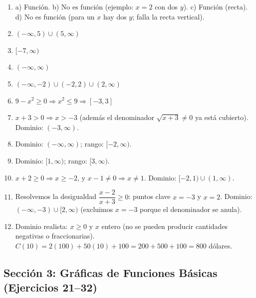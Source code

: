 \documentclass[12pt, letterpaper]{article}
\begin{document}
  \begin{enumerate}[resume=respuestas, leftmargin=*, label=\textbf{\arabic*.}]
    \item a) Función. b) No es función (ejemplo: $x=2$ con dos $y$). c) Función (recta). d) No es función (para un $x$ hay dos $y$; falla la recta vertical).

    \item $(-\infty, 5) \cup (5, \infty)$

    \item $[-7, \infty)$

    \item $(-\infty, \infty)$

    \item $(-\infty, -2) \cup (-2, 2) \cup (2, \infty)$

    \item $9 - x^2 \geq 0 \Rightarrow x^2 \leq 9 \Rightarrow [-3, 3]$

    \item $x + 3 > 0 \Rightarrow x > -3$ (además el denominador $\sqrt{x+3} \neq 0$ ya está cubierto). Dominio: $(-3, \infty)$.

    \item Dominio: $(-\infty, \infty)$; rango: $[-2, \infty)$.

    \item Dominio: $[1, \infty)$; rango: $[3, \infty)$.

    \item $x + 2 \geq 0 \Rightarrow x \geq -2$, y $x - 1 \neq 0 \Rightarrow x \neq 1$. Dominio: $[-2, 1) \cup (1, \infty)$.

    \item Resolvemos la desigualdad $\dfrac{x-2}{x+3} \geq 0$: puntos clave $x = -3$ y $x = 2$. Dominio: $(-\infty, -3) \cup [2, \infty)$ (excluimos $x = -3$ porque el denominador se anula).

    \item Dominio realista: $x \geq 0$ y $x$ entero (no se pueden producir cantidades negativas o fraccionarias). $C(10) = 2(100) + 50(10) + 100 = 200 + 500 + 100 = 800$ dólares.
  \end{enumerate}

  \newpage


  \subsection*{Sección 3: Gráficas de Funciones Básicas (Ejercicios 21--32)}
\end{document}
